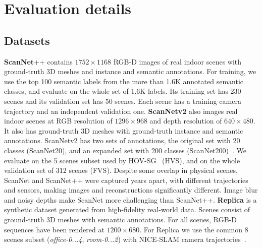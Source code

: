 \clearpage
\setcounter{page}{1}
\appendix
\section{Evaluation details}
\subsection{Datasets}
\label{sup:datasets}
\textbf{ScanNet}++ contains \(1752\times1168\) RGB-D images of real indoor scenes with ground-truth 3D meshes and instance and semantic annotations. 
For training, we use the top 100 semantic labels from the more than 1.6K annotated semantic classes, and evaluate on the whole set of 1.6K labels.
Its training set has 230 scenes and its validation set has 50 scenes. 
Each scene has a training camera trajectory and an independent validation one.
\newline
\textbf{ScanNetv2} also images real indoor scenes at RGB resolution of \(1296\!\times\!968\) and depth resolution of \(640\!\times\!480\).
It also has ground-truth 3D meshes with ground-truth instance and semantic annotations.
ScanNetv2 has two sets of annotations, the original set with 20 classes (ScanNet20), and an expanded set with 200 classes (ScanNet200)~\cite{rozenberszki2022language}.
We evaluate on the 5 scenes subset used by HOV-SG~\cite{hovsg} (HVS), and on the whole validation set of 312 scenes (FVS). 
Despite some overlap in physical scenes, ScanNet and ScanNet++ were captured years apart, with different trajectories and sensors, making images and reconstructions significantly different.
Image blur and noisy depths make ScanNet more challenging than ScanNet++.
\newline
\textbf{Replica} is a synthetic dataset generated from high-fidelity real-world data.
Scenes consist of ground-truth 3D meshes with semantic annotations. For all scenes, RGB-D sequences have been rendered at \(1200\!\times\!680\). For Replica we use the common 8 scenes subset (\textit{office-0...4}, \textit{room-0...2}) with NICE-SLAM camera trajectories~\cite{zhu2022nice}.
%
